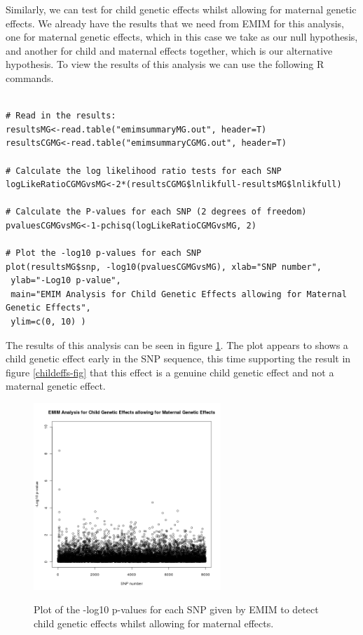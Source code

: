 \documentclass[a4paper,12pt]{article}
\begin{document}
Similarly, we can test for child genetic effects whilst allowing for maternal genetic effects. We already have the results that we need from EMIM for this analysis, one for maternal genetic effects, which in this case we take as our null hypothesis, and another for child and maternal effects together, which is our alternative hypothesis. To view the results of this analysis we can use the following R commands. 
\vspace{0.35cm} \begin{lstlisting}

# Read in the results:
resultsMG<-read.table("emimsummaryMG.out", header=T)
resultsCGMG<-read.table("emimsummaryCGMG.out", header=T)

# Calculate the log likelihood ratio tests for each SNP
logLikeRatioCGMGvsMG<-2*(resultsCGMG$lnlikfull-resultsMG$lnlikfull)

# Calculate the P-values for each SNP (2 degrees of freedom)
pvaluesCGMGvsMG<-1-pchisq(logLikeRatioCGMGvsMG, 2)

# Plot the -log10 p-values for each SNP
plot(resultsMG$snp, -log10(pvaluesCGMGvsMG), xlab="SNP number",
 ylab="-Log10 p-value",
 main="EMIM Analysis for Child Genetic Effects allowing for Maternal Genetic Effects",
 ylim=c(0, 10) )

\end{lstlisting} \vspace{0.35cm}
The results of this analysis can be seen in figure  \ref{childnotmateffs-fig}. The plot appears to shows a child genetic effect early in the SNP sequence, this time supporting the result in figure  \ref{childeffs-fig} that this effect is a genuine child genetic effect and not a maternal genetic effect. 
{\begin{figure}[ht]
{\begin{center}
{\includegraphics[width=200pt]{plotChildwoMaternalEffects.png}}
\caption{Plot of the -log10 p-values for each SNP given by EMIM to detect child genetic effects whilst allowing for maternal effects.}
\label{childnotmateffs-fig}
\end{center}}
\end{figure}
}
\end{document}

